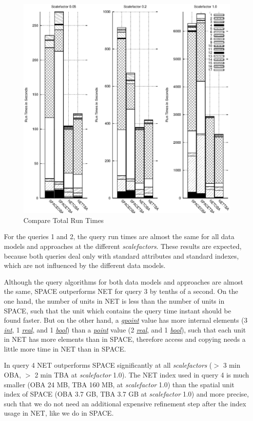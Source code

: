 \documentclass[a4paper]{article}
\newcommand{\dt}[1]{\textsl{\underline{#1}}}
\begin{document}
\begin{figure}
  \includegraphics[width=1.0\linewidth]{compruntimesall.eps}
  \caption{Compare Total Run Times}
  \label{fig:CompTotalRunTimesGraphic}
\end{figure}

For the queries 1 and 2, the query run times are almost the same for all data
models
and approaches at the different \textit{scalefactors}. These results are expected,
because
both queries deal only with standard attributes and standard indexes, which
are not influenced by the different data models.

Although the query algorithms for both data models and approaches are almost the
same, SPACE outperforms NET for query 3 by tenths of a second. On the one hand,
the
number of units in NET is less than the number of units in SPACE,
such that the unit which contains the query time instant should be found faster.
But on the other hand, a \dt{gpoint} value has more internal elements (3
\dt{int},
1 \dt{real}, and 1 \dt{bool}) than a \dt{point} value (2 \dt{real}, and 1
\dt{bool}),
such that each unit in NET has more elements than in SPACE, therefore
access and copying needs a little more time in NET than in SPACE.

In query 4 NET outperforms SPACE significantly at all \textit{scalefactors} ($>$ 3 min
OBA,
$>$ 2 min TBA at \textit{scalefactor} 1.0). The NET index used in query 4 is
much smaller
(OBA 24 MB, TBA 160 MB, at \textit{scalefactor} 1.0) than the spatial unit index
of SPACE
(OBA 3.7 GB, TBA 3.7 GB at \textit{scalefactor} 1.0) and more precise, such that
we do not
need an additional expensive refinement step after the index usage in NET,
like we do in SPACE.
\end{document}
